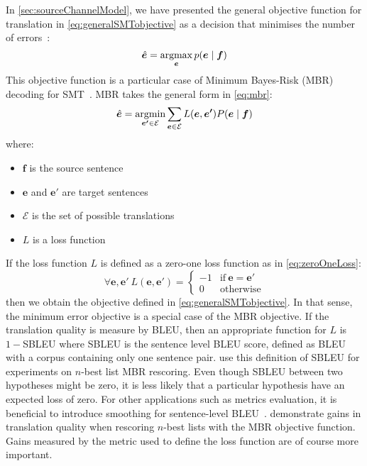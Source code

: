 In \autoref{sec:sourceChannelModel}, we have presented the general
objective function for translation in \autoref{eq:generalSMTobjective}
as a decision that
minimises the number of
errors~\citep[p.~39-40]{bishop:2006:book}:
%
\begin{equation}
  \hat{\bm{e}} = \operatorname*{argmax}_{\bm{e}} p(\bm{e} \mid \bm{f})
  \label{eq:generalSMTobjective}
\end{equation}
%
This objective function is a particular case of
Minimum Bayes-Risk (MBR) decoding for SMT~\citep{kumar-byrne:2004:NAACL}.
MBR takes the general form in \autoref{eq:mbr}:
%
\begin{equation} \label{eq:mbr}
  \hat{\bm{e}} = \operatorname*{argmin}_{\bm{e'} \in \mathcal{E}} \sum_{\bm{e} \in \mathcal{E}} L(\bm{e},\bm{e'}) P(\bm{e} \mid \bm{f})
\end{equation}
%
where:
%
\begin{itemize}
  \item $\bm{f}$ is the source sentence
  \item $\bm{e}$ and $\bm{e'}$ are target sentences
  \item $\mathcal{E}$ is the set of possible translations
  \item $L$ is a loss function
\end{itemize}
%
If the loss function $L$ is defined as a zero-one loss function as
in \autoref{eq:zeroOneLoss}:
%
\begin{equation}
\forall \bm{e}, \bm{e'} \ L(\bm{e}, \bm{e'}) =
\begin{cases}
  -1 & \text{if}\ \bm{e} = \bm{e'} \\
  0  & \text{otherwise}
\end{cases}
\label{eq:zeroOneLoss}
\end{equation}
%
then we obtain the objective defined in \autoref{eq:generalSMTobjective}.
In that sense, the minimum error objective is a special case of the
MBR objective.
If the translation quality is measure by
BLEU, then an appropriate function for $L$ is $1 - $SBLEU where SBLEU is the %
sentence level BLEU score, defined as BLEU with a corpus containing
only one sentence pair. \citet{kumar-byrne:2004:NAACL} use
this definition of SBLEU for experiments on $n$-best list
MBR rescoring. Even though
SBLEU between two hypotheses might be zero, it is less likely
that a particular hypothesis have an expected loss of zero.
For other applications such as metrics evaluation, it is beneficial
to introduce smoothing for sentence-level
BLEU~\citep{lin-och:2004:COLING}. %
\citet{kumar-byrne:2004:NAACL} demonstrate gains in translation quality
when rescoring $n$-best lists %
with the MBR objective function. Gains measured by the metric used
to define the loss function are of course more important.

